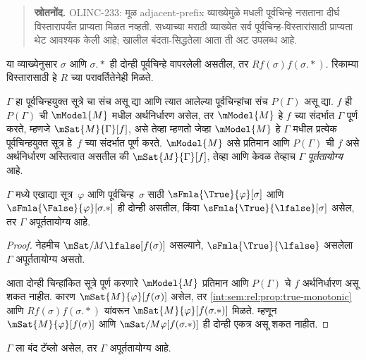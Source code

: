 \begin{quote}\small\textbf{स्रोतनोंद.} OLINC-233: मूळ adjacent-prefix व्याख्येमुळे मधली पूर्वचिन्हे नसताना दीर्घ विस्तारापर्यंत प्राप्यता मिळत नव्हती. सध्याच्या मराठी व्याख्येत सर्व पूर्वचिन्ह-विस्तारांसाठी प्राप्यता थेट आवश्यक केली आहे; खालील बंदता-सिद्धतेला आता ती अट उपलब्ध आहे.\end{quote}
या व्याख्येनुसार $\sigma$ आणि $\sigma.{*}$ ही दोन्ही
पूर्वचिन्हे वापरलेली असतील, तर $Rf(\sigma)f(\sigma.{*})$.
रिकाम्या विस्तारासाठी हे $R$ च्या परावर्तितेनेही मिळते.

\begin{defn}
  $\Gamma$ हा पूर्वचिन्हयुक्त सूत्रे
  चा संच असू द्या आणि त्यात आलेल्या
  पूर्वचिन्हांचा संच $P(\Gamma)$ असू द्या.
  $f$ ही $P(\Gamma)$ ची
  $\mModel{M}$ मधील अर्थनिर्धारण
  असेल, तर $\mModel{M}$ हे
  $f$ च्या संदर्भात $\Gamma$
  पूर्ण करते, म्हणजे
  $\mSat{M}{\Gamma}[f]$, असे
  तेव्हा म्हणतो जेव्हा
  $\mModel{M}$ हे $\Gamma$ मधील
  प्रत्येक पूर्वचिन्हयुक्त
  सूत्र हे~$f$ च्या संदर्भात
  पूर्ण करते. $\mModel{M}$ असे
  प्रतिमान आणि $P(\Gamma)$ ची
  $f$ असे अर्थनिर्धारण अस्तित्वात
  असतील की $\mSat{M}{\Gamma}[f]$,
  तेव्हा आणि केवळ तेव्हाच $\Gamma$ \emph{पूर्ततायोग्य}
  आहे.
\end{defn}

\begin{prop}
  $\Gamma$ मध्ये एखाद्या
  सूत्र~$\varphi$ आणि पूर्वचिन्ह~$\sigma$
  साठी $\sFmla{\True}{\varphi}[\sigma]$ आणि
  $\sFmla{\False}{\varphi}[\sigma.{*}]$
  ही दोन्ही असतील, किंवा
  $\sFmla{\True}{\lfalse}[\sigma]$
  असेल, तर $\Gamma$ अपूर्ततायोग्य आहे.
\end{prop}

\begin{proof}
  नेहमीच $\mSat/{M}{\lfalse}[f(\sigma)]$
  असल्याने, $\sFmla{\True}{\lfalse}$
  असलेला $\Gamma$ अपूर्ततायोग्य असतो.

  आता दोन्ही चिन्हांकित सूत्रे पूर्ण
  करणारे $\mModel{M}$ प्रतिमान आणि
  $P(\Gamma)$ चे $f$ अर्थनिर्धारण
  असू शकत नाहीत. कारण
  $\mSat{M}{\varphi}[f(\sigma)]$
  असेल, तर
  \ref{int:sem:rel:prop:true-monotonic}
  आणि $Rf(\sigma)f(\sigma.{*})$
  यांवरून
  $\mSat{M}{\varphi}[f(\sigma.{*})]$
  मिळते. म्हणून
  $\mSat{M}{\varphi}[f(\sigma)]$ आणि
  $\mSat/{M}{\varphi}[f(\sigma.{*})]$
  ही दोन्ही एकत्र असू शकत नाहीत.
\end{proof}

\begin{thm}[निर्दोषता]
  \label{int:tab:sou:thm:tableau-soundness}
  $\Gamma$ ला बंद टॅब्लो
  असेल, तर $\Gamma$ अपूर्ततायोग्य
  आहे.
\end{thm}

